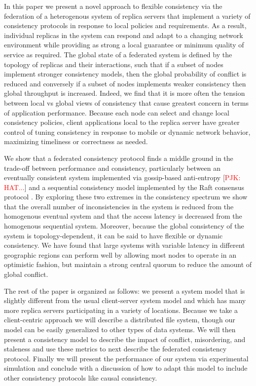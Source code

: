 \documentclass[10pt,conference,compsocconf,letterpaper]{IEEEtran}
\newcommand{\todo}[1]{{\textcolor{red}{#1}}}
\newcommand{\pjk}[1]{[\todo{PJK: #1}]}
\begin{document}
In this paper we present a novel approach to flexible consistency via the federation of a heterogenous system of replica servers that implement a variety of consistency protocols in response to local policies and requirements. As a result, individual replicas in the system can respond and adapt to a changing network environment while providing as strong a local guarantee or minimum quality of service as required. The global state of a federated system is defined by the topology of replicas and their interactions, such that if a subset of nodes implement stronger consistency models, then the global probability of conflict is reduced and conversely if a subset of nodes implements weaker consistency then global throughput is increased. Indeed, we find that it is more often the tension between local vs global views of consistency that cause greatest concern in terms of application performance. Because each node can select and change local consistency policies, client applications local to the replica server have greater control of tuning consistency in response to mobile or dynamic network behavior, maximizing timeliness or correctness as needed.

We show that a federated consistency protocol finds a middle ground in the trade-off between performance and consistency, particularly between an eventually consistent system implemented via gossip-based anti-entropy \cite{kempe_gossip-based_2003} \pjk{HAT...} and a sequential consistency model implemented by the Raft consensus protocol \cite{ongaro_search_2014}. By exploring these two extremes in the consistency spectrum we show that the overall number of inconsistencies in the system is reduced from the homogenous eventual system and that the access latency is decreased from the homogenous sequential system. Moreover, because the global consistency of the system is topology-dependent, it can be said to have flexible or dynamic consistency. We have found that large systems with variable latency in different geographic regions can perform well by allowing most nodes to operate in an optimistic fashion, but maintain a strong central quorum to reduce the amount of global conflict.

The rest of the paper is organized as follows: we present a system model that is slightly different from the usual client-server system model and which has many more replica servers participating in a variety of locations. Because we take a client-centric approach we will describe a distributed file system, though our model can be easily generalized to other types of data systems. We will then present a consistency model to describe the impact of conflict, misordering, and staleness and use these metrics to next describe the federated consistency protocol. Finally we will present the performance of our system via experimental simulation and conclude with a discussion of how to adapt this model to include other consistency protocols like causal consistency.
\end{document}
